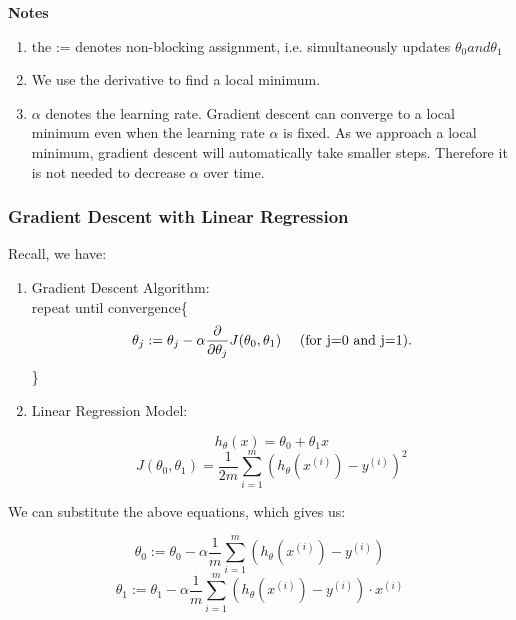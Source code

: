            \textbf{Notes}
               \begin{enumerate}
                   \item the := denotes non-blocking assignment, i.e. simultaneously updates $\theta_0 and \theta_1$ 
                   \item We use the derivative to find a local minimum. 
                   \item $\alpha$ denotes the learning rate. Gradient descent can converge to a local minimum even when the learning rate $\alpha$ is fixed. As we approach a local minimum, gradient descent will automatically take smaller steps. Therefore it is not needed to decrease $\alpha$ over time. 
               \end{enumerate}

       \subsubsection{Gradient Descent with Linear Regression}
     
       Recall, we have:
       \begin{enumerate}
           \item Gradient Descent Algorithm: \\ 
               \linebreak
               repeat until convergence\{  
                    \[ \theta_j := \theta_j - \alpha \frac{\partial }{\partial \theta_j} J(\theta_0, \theta_1)\mbox{\hspace{10pt} (for j=0 and j=1)} 
                   .\] \}


           \item Linear Regression Model:
               \begin{center}
                   \[h_\theta (x) = \theta_0 + \theta_1x\]
                   \[J(\theta_0, \theta_1) = \frac{1}{2m} \sum_{i=1}^{m} (h_\theta(x^{(i)}) - y^{(i)} )^2\]             

               \end{center}

       \end{enumerate}
            
                 
                
    We can substitute the above equations, which gives us:
       \begin{center}
           \[\theta_0 := \theta_0 - \alpha \frac{1}{m} \sum_{i=1}^{m} (h_\theta(x^{(i)}) - y^{(i)} )\] 
               \[\theta_1 := \theta_1 - \alpha \frac{1}{m} \sum_{i=1}^{m} (h_\theta(x^{(i)}) - y^{(i)} ) \cdot x^{(i)}\]  

       
       \end{center} 
    

